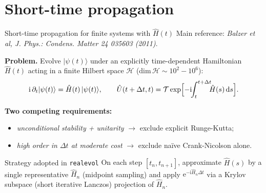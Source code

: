 \documentclass[10pt,aspectratio=169]{beamer}
\newcommand{\realevol}{\texttt{realevol}}
\begin{document}
\section{Short-time propagation}

\begin{frame}{Short-time propagation for finite systems with $\hat H(t)$}
  \footnotesize Main reference: \emph{Balzer et al, J. Phys.: Condens. Matter 24 035603 (2011)}.

  \medskip
  \textbf{Problem.} Evolve $|\psi(t)\rangle$ under an explicitly
  time-dependent Hamiltonian $\hat H(t)$ acting in a finite Hilbert space
  $\mathcal{H}$ (dim$\,\mathcal{H}\sim 10^2{-}10^6$):
  \[
    \mathrm{i}\,\partial_t |\psi(t)\rangle = \hat H(t)\,|\psi(t)\rangle,
    \qquad
    \hat U(t+\Delta t,t)=\mathcal{T}\exp\Bigl[-\mathrm{i}\!\!\int_t^{t+\Delta t}\!\!\!\hat H(s)\,\mathrm{d}s\Bigr].
  \]

  \textbf{Two competing requirements:}
  \begin{itemize}
    \item \emph{unconditional stability + unitarity}
          $\to$ exclude explicit Runge-Kutta;
    \item \emph{high order in $\Delta t$ at moderate cost}
          $\to$ exclude naïve Crank-Nicolson alone.
  \end{itemize}

  \begin{block}{Strategy adopted in \realevol}
    On each step $[t_n,t_{n+1}]$, approximate $\hat H(s)$ by a single
    representative $\hat H_n$ (midpoint sampling) and apply
    $\mathrm{e}^{-\mathrm{i}\hat H_n \Delta t}$ via a Krylov subspace
    (short iterative Lanczos) projection of $\hat H_n$.
\end{block}
\end{frame}
\end{document}

